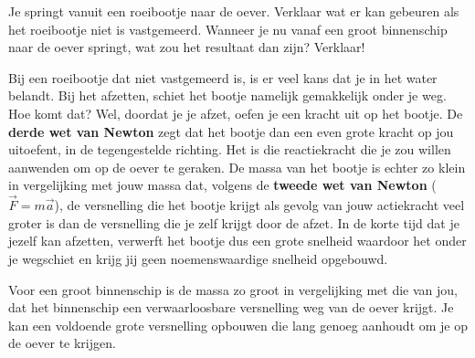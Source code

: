 

\item{}Je springt vanuit een roeibootje naar de oever. Verklaar wat er kan gebeuren als het roeibootje niet is vastgemeerd. Wanneer je nu vanaf een groot binnenschip naar de oever springt, wat zou het resultaat dan zijn? Verklaar!
\begin{oplossing}

Bij een roeibootje dat niet vastgemeerd is, is er veel kans dat je in het water belandt. Bij het afzetten, schiet het bootje namelijk gemakkelijk onder je weg. Hoe komt dat? Wel, doordat je je afzet, oefen je een kracht uit op het bootje. De \textbf{derde wet van Newton} zegt dat het bootje dan een even grote kracht op jou uitoefent, in de tegengestelde richting. Het is die reactiekracht die je zou willen aanwenden om op de oever te geraken. De massa van het bootje is echter zo klein in vergelijking met jouw massa dat, volgens de \textbf{tweede wet van Newton} ($\vec{F}=m\vec{a}$), de versnelling die het bootje krijgt als gevolg van jouw actiekracht veel groter is dan de versnelling die je zelf krijgt door de afzet. In de korte tijd dat je jezelf kan afzetten, verwerft het bootje dus een grote snelheid waardoor het onder je wegschiet en krijg jij geen noemenswaardige snelheid opgebouwd.


Voor een groot binnenschip is de massa zo groot in vergelijking met die van jou, dat het binnenschip een verwaarloosbare versnelling weg van de oever krijgt. Je kan een voldoende grote versnelling opbouwen die lang genoeg aanhoudt om je op de oever te krijgen.
\end{oplossing}



